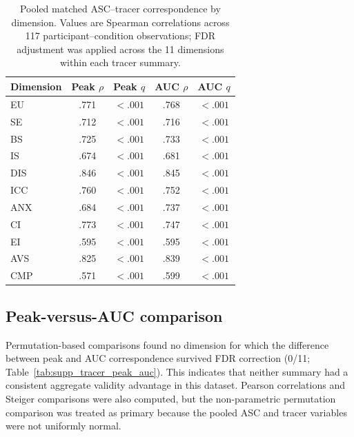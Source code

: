 \documentclass[pdflatex,sn-mathphys-num]{sn-jnl}
\begin{document}
\begin{table}[!htbp]
\centering
\small
\caption{Pooled matched ASC--tracer correspondence by dimension. Values are Spearman correlations across 117 participant--condition observations; FDR adjustment was applied across the 11 dimensions within each tracer summary.}
\label{tab:supp_tracer_correspondence}
\begin{tabular}{@{}lcccc@{}}
\toprule
Dimension & Peak $\rho$ & Peak $q$ & AUC $\rho$ & AUC $q$ \\
\midrule
EU  & .771 & $<.001$ & .768 & $<.001$ \\
SE  & .712 & $<.001$ & .716 & $<.001$ \\
BS  & .725 & $<.001$ & .733 & $<.001$ \\
IS  & .674 & $<.001$ & .681 & $<.001$ \\
DIS & .846 & $<.001$ & .845 & $<.001$ \\
ICC & .760 & $<.001$ & .752 & $<.001$ \\
ANX & .684 & $<.001$ & .737 & $<.001$ \\
CI  & .773 & $<.001$ & .747 & $<.001$ \\
EI  & .595 & $<.001$ & .595 & $<.001$ \\
AVS & .825 & $<.001$ & .839 & $<.001$ \\
CMP & .571 & $<.001$ & .599 & $<.001$ \\
\bottomrule
\end{tabular}
\end{table}

\subsection{Peak-versus-AUC comparison}

Permutation-based comparisons found no dimension for which the difference between peak and AUC correspondence survived FDR correction (0/11; Table~\ref{tab:supp_tracer_peak_auc}). This indicates that neither summary had a consistent aggregate validity advantage in this dataset. Pearson correlations and Steiger comparisons were also computed, but the non-parametric permutation comparison was treated as primary because the pooled ASC and tracer variables were not uniformly normal.
\end{document}
